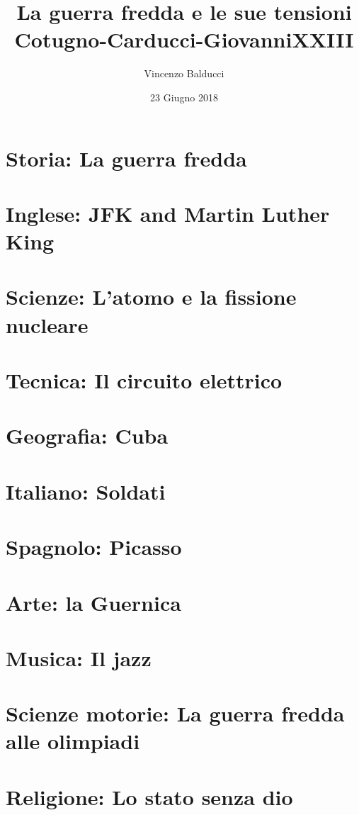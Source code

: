 \documentclass[12pt]{report}
\title{
  {La guerra fredda e le sue tensioni}\\
  {\large Cotugno-Carducci-GiovanniXXIII}
}
\author{Vincenzo Balducci}
\date{23 Giugno 2018}
\begin{document}
\maketitle

\tableofcontents

\chapter{Storia: La guerra fredda}


\chapter{Inglese: JFK and Martin Luther King}


\chapter{Scienze: L'atomo e la fissione nucleare}


\chapter{Tecnica: Il circuito elettrico}


\chapter{Geografia: Cuba}


\chapter{Italiano: Soldati}



\chapter{Spagnolo: Picasso}


\chapter{Arte: la Guernica}


\chapter{Musica: Il jazz}


\chapter{Scienze motorie: La guerra fredda alle olimpiadi}


\chapter{Religione: Lo stato senza dio}

\end{document}
